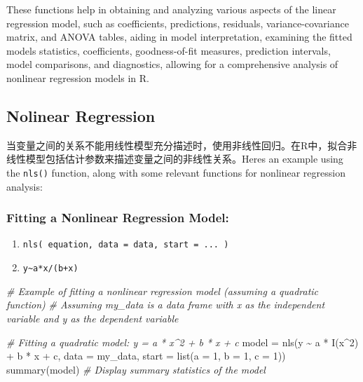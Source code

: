 \documentclass[
]{article}
\newenvironment{Shaded}{}{}
\newcommand{\AttributeTok}[1]{\textcolor[rgb]{0.49,0.56,0.16}{#1}}
\newcommand{\CommentTok}[1]{\textcolor[rgb]{0.38,0.63,0.69}{\textit{#1}}}
\newcommand{\DecValTok}[1]{\textcolor[rgb]{0.25,0.63,0.44}{#1}}
\newcommand{\FunctionTok}[1]{\textcolor[rgb]{0.02,0.16,0.49}{#1}}
\newcommand{\NormalTok}[1]{#1}
\newcommand{\OtherTok}[1]{\textcolor[rgb]{0.00,0.44,0.13}{#1}}
\newcommand{\SpecialCharTok}[1]{\textcolor[rgb]{0.25,0.44,0.63}{#1}}
\begin{document}
These functions help in obtaining and analyzing various aspects of the
linear regression model, such as coefficients, predictions, residuals,
variance-covariance matrix, and ANOVA tables, aiding in model
interpretation, examining the fitted model\textquotesingle s statistics,
coefficients, goodness-of-fit measures, prediction intervals, model
comparisons, and diagnostics, allowing for a comprehensive analysis of
nonlinear regression models in R.

\hypertarget{nolinear-regression}{%
\subsection{Nolinear Regression}\label{nolinear-regression}}

当变量之间的关系不能用线性模型充分描述时，使用非线性回归。在R中，拟合非线性模型包括估计参数来描述变量之间的非线性关系。Here\textquotesingle s
an example using the \texttt{nls()} function, along with some relevant
functions for nonlinear regression analysis:

\hypertarget{fitting-a-nonlinear-regression-model}{%
\subsubsection{Fitting a Nonlinear Regression
Model:}\label{fitting-a-nonlinear-regression-model}}

\begin{enumerate}
\def\labelenumi{\arabic{enumi}.}
\item
  \texttt{nls(\ equation,\ data\ =\ data,\ start\ =\ ...\ )}
\item
  \texttt{y\textasciitilde{}a*x/(b+x)}
\end{enumerate}

\begin{Shaded}
\begin{Highlighting}[]
\CommentTok{\# Example of fitting a nonlinear regression model (assuming a quadratic function)}
\CommentTok{\# Assuming \textquotesingle{}my\_data\textquotesingle{} is a data frame with \textquotesingle{}x\textquotesingle{} as the independent variable and \textquotesingle{}y\textquotesingle{} as the dependent variable}

\CommentTok{\# Fitting a quadratic model: y = a * x\^{}2 + b * x + c}
\NormalTok{model }\OtherTok{=} \FunctionTok{nls}\NormalTok{(y }\SpecialCharTok{\textasciitilde{}}\NormalTok{ a }\SpecialCharTok{*} \FunctionTok{I}\NormalTok{(x}\SpecialCharTok{\^{}}\DecValTok{2}\NormalTok{) }\SpecialCharTok{+}\NormalTok{ b }\SpecialCharTok{*}\NormalTok{ x }\SpecialCharTok{+}\NormalTok{ c, }\AttributeTok{data =}\NormalTok{ my\_data, }\AttributeTok{start =} \FunctionTok{list}\NormalTok{(}\AttributeTok{a =} \DecValTok{1}\NormalTok{, }\AttributeTok{b =} \DecValTok{1}\NormalTok{, }\AttributeTok{c =} \DecValTok{1}\NormalTok{))}
\FunctionTok{summary}\NormalTok{(model)  }\CommentTok{\# Display summary statistics of the model}
\end{Highlighting}
\end{Shaded}
\end{document}

